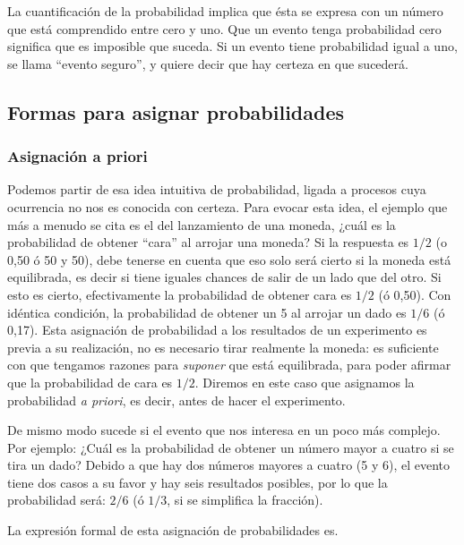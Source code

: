 \documentclass[]{article}
\begin{document}
La cuantificación de la probabilidad implica que ésta se expresa con un
número que está comprendido entre cero y uno. Que un evento tenga
probabilidad cero significa que es imposible que suceda. Si un evento
tiene probabilidad igual a uno, se llama ``evento seguro'', y quiere
decir que hay certeza en que sucederá.

\hypertarget{formas-para-asignar-probabilidades}{%
\subsection{Formas para asignar
probabilidades}\label{formas-para-asignar-probabilidades}}

\hypertarget{asignaciuxf3n-a-priori}{%
\subsubsection{Asignación a priori}\label{asignaciuxf3n-a-priori}}

Podemos partir de esa idea intuitiva de probabilidad, ligada a procesos
cuya ocurrencia no nos es conocida con certeza. Para evocar esta idea,
el ejemplo que más a menudo se cita es el del lanzamiento de una moneda,
¿cuál es la probabilidad de obtener ``cara'' al arrojar una moneda? Si
la respuesta es \(1/2\) (o 0,50 ó 50 y 50), debe tenerse en cuenta que
eso solo será cierto si la moneda está equilibrada, es decir si tiene
iguales chances de salir de un lado que del otro. Si esto es cierto,
efectivamente la probabilidad de obtener cara es \(1/2\) (ó 0,50). Con
idéntica condición, la probabilidad de obtener un 5 al arrojar un dado
es \(1/6\) (ó 0,17). Esta asignación de probabilidad a los resultados de
un experimento es previa a su realización, no es necesario tirar
realmente la moneda: es suficiente con que tengamos razones para
\emph{suponer} que está equilibrada, para poder afirmar que la
probabilidad de cara es \(1/2\). Diremos en este caso que asignamos la
probabilidad \emph{a priori}, es decir, antes de hacer el experimento.

De mismo modo sucede si el evento que nos interesa en un poco más
complejo. Por ejemplo: ¿Cuál es la probabilidad de obtener un número
mayor a cuatro si se tira un dado? Debido a que hay dos números mayores
a cuatro (5 y 6), el evento tiene dos casos a su favor y hay seis
resultados posibles, por lo que la probabilidad será: \(2/6\) (ó
\(1/3\), si se simplifica la fracción).

La expresión formal de esta asignación de probabilidades es.
\end{document}
